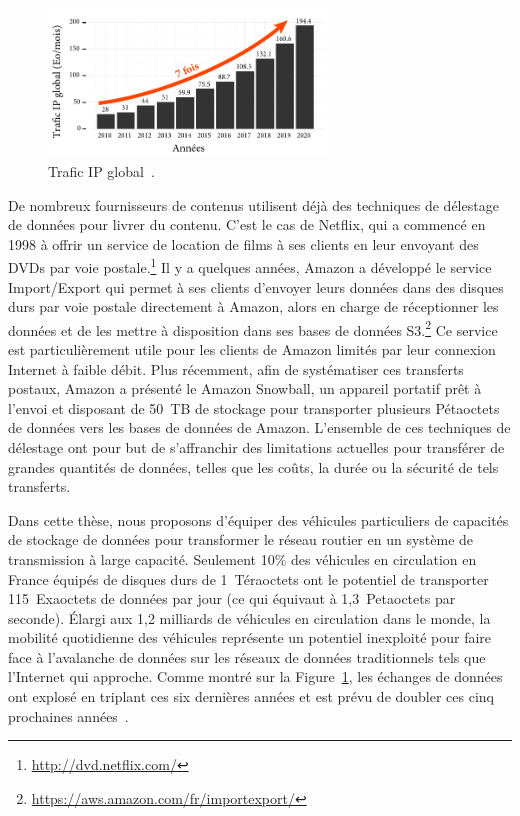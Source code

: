 \begin{figure}
    \vspace{-15pt}
    \centering
    \includegraphics[width=7.5cm]{figures-fr/vni-fr.pdf}
    \vspace{-5pt}
    \caption{Trafic IP global~\cite{index2014forecast}.}
    \label{fig:vni-fr}
\end{figure}
De nombreux fournisseurs de contenus utilisent déjà des techniques de délestage de données pour livrer du contenu. C’est le cas de Netflix, qui a commencé en 1998 à offrir un service de location de films à ses clients en leur envoyant des DVDs par voie postale.\footnote{\url{http://dvd.netflix.com/}} Il y a quelques années, Amazon a développé le service Import/Export qui permet à ses clients d’envoyer leurs données dans des disques durs par voie postale directement à Amazon, alors en charge de réceptionner les données et de les mettre à disposition dans ses bases de données S3.\footnote{\url{https://aws.amazon.com/fr/importexport/}} Ce service est particulièrement utile pour les clients de Amazon limités par leur connexion Internet à faible débit. Plus récemment, afin de systématiser ces transferts postaux, Amazon a présenté le Amazon Snowball, un appareil portatif prêt à l’envoi et disposant de 50~TB de stockage pour transporter plusieurs Pétaoctets de données vers les bases de données de Amazon. L’ensemble de ces techniques de délestage ont pour but de s’affranchir des limitations actuelles pour transférer de grandes quantités de données, telles que les coûts, la durée ou la sécurité de tels transferts. 

Dans cette thèse, nous proposons d’équiper des véhicules particuliers de capacités de stockage de données pour transformer le réseau routier en un système de transmission à large capacité. Seulement 10\% des véhicules en circulation en France équipés de disques durs de 1~Téraoctets ont le potentiel de transporter 115~Exaoctets de données par jour (ce qui équivaut à 1,3~Petaoctets par seconde). Élargi aux 1,2 milliards de véhicules en circulation dans le monde, la mobilité quotidienne des véhicules représente un potentiel inexploité pour faire face à l’avalanche de données sur les réseaux de données traditionnels tels que l'Internet qui approche. Comme montré sur la Figure~\ref{fig:vni-fr}, les échanges de données ont explosé en triplant ces six dernières années et est prévu de doubler ces cinq prochaines années~\cite{index2014forecast,gantz2012digital,hecht2016bandwidth}. 

